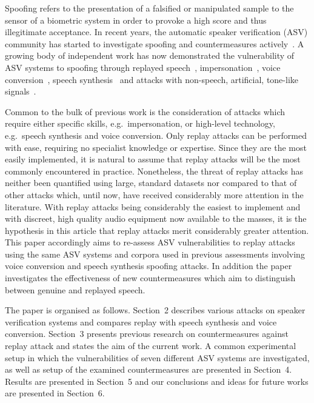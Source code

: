 

Spoofing refers to the presentation of a falsified or manipulated sample 
to the sensor of a biometric system in order to provoke a high score and 
thus illegitimate acceptance.
In recent years, the automatic speaker verification (ASV) community has 
started to investigate spoofing and countermeasures 
actively~\cite{interspeechSpecialSession, handbookChapter, Wu2014a}. 
A growing 
body of independent work has now demonstrated the vulnerability of ASV 
systems to spoofing through 
replayed speech~\cite{Lindberg1999,Villalba2010},
impersonation~\cite{Blomberg2004,Farrus2008}, voice 
conversion~\cite{Perrot2005, Bonastre2007}, speech 
synthesis~\cite{Masuko1999, Leon2010} and attacks with non-speech, 
artificial, tone-like signals~\cite{Alegre2012b}.

Common to the bulk of previous work is the consideration of attacks 
which require either specific skills, e.g.~impersonation, or high-level 
technology, e.g.~speech synthesis and voice conversion. 
Only replay attacks can be performed with ease, requiring no specialist 
knowledge or expertise.  Since they are the most easily 
implemented, it is natural to assume that replay attacks will be the 
most commonly encountered in practice.  Nonetheless, the threat of 
replay attacks has neither been quantified using large, standard 
datasets nor compared to that of other attacks which, until now, have 
received considerably more attention in the literature.
With replay attacks being considerably the easiest to implement
and with discreet, high quality audio equipment now available to the masses,
it is the hypothesis in this article that replay attacks merit
considerably greater attention.
This paper accordingly aims to re-assess ASV vulnerabilities 
to replay attacks using the same ASV systems and corpora used in 
previous assessments involving voice conversion and speech synthesis 
spoofing attacks.  In addition the paper investigates the effectiveness of 
new countermeasures which aim to distinguish between genuine and replayed speech.  

The paper is organised as follows.  Section~2 describes various attacks on speaker verification systems and compares replay with speech synthesis and voice conversion. Section~3 presents previous research on countermeasures against replay attack and states the aim of the current work. A common experimental setup in which the vulnerabilities of seven different ASV systems are investigated, as well as setup of the examined countermeasures are presented in Section~4. Results are presented in Section~5 and our conclusions and ideas for future works are presented in Section~6.
